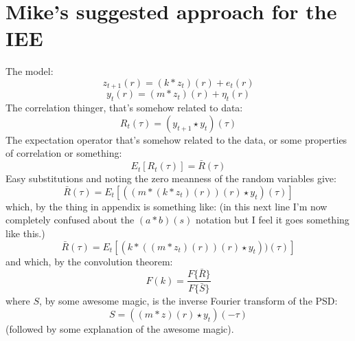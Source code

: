 \documentclass[10pt,twocolumn,twoside]{IEEEtran}
\begin{document}
\section{Mike's suggested approach for the IEE}

The model:
\[
    z_{t+1}(r) = (k * z_t)(r) + e_t(r)
\]
\[
    y_t(r) = (m * z_t)(r) + \eta_t(r)
\]
The correlation thinger, that's somehow related to data:
\[
    R_t(\tau) = (y_{t+1} \star y_t)(\tau)
\]
The expectation operator that's somehow related to the data, or some properties of correlation or something: 
\[
    E_t[R_t(\tau)] = \bar{R}(\tau)
\]
Easy substitutions and noting the zero meanness of the random variables give:
\[
    \bar{R}(\tau) = E_t [ ((m * (k*z_t)(r))(r) \star y_t)(\tau)]
\]
which, by the thing in appendix is something like:
(in this next line I'm now completely confused about the $(a*b)(s)$ notation but I feel it goes something like this.)
\[
    \bar{R}(\tau) = E_t [ (k * ((m*z_t)(r))(r) \star y_t))(\tau)]
\]
and which, by the convolution theorem:
\[
    F(k) = \frac{F\{{\bar{R}}\}}{F\{{\bar{S}}\}}
\]
where $S$, by some awesome magic, is the inverse Fourier transform of the PSD:
\[
    S = ((m*z)(r) \star y_t)(-\tau)
\]
(followed by some explanation of the awesome magic).
\end{document}
